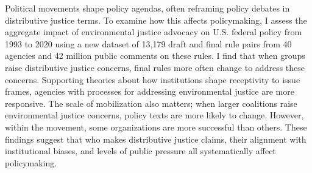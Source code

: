 Political movements shape policy agendas, often reframing policy debates in distributive justice terms.  To examine how this affects policymaking, I assess the aggregate impact of environmental justice advocacy on U.S. federal policy from 1993 to 2020 using a new dataset of 13,179 draft and final rule pairs from 40 agencies and 42 million public comments on these rules. I find that when groups raise distributive justice concerns, final rules more often change to address these concerns. Supporting theories about how institutions shape receptivity to issue frames, agencies with processes for addressing environmental justice are more responsive. The scale of mobilization also matters; when larger coalitions raise environmental justice concerns, policy texts are more likely to change. However, within the movement, some organizations are more successful than others. These findings suggest that who makes distributive justice claims, their alignment with institutional biases, and levels of public pressure all systematically affect policymaking.
